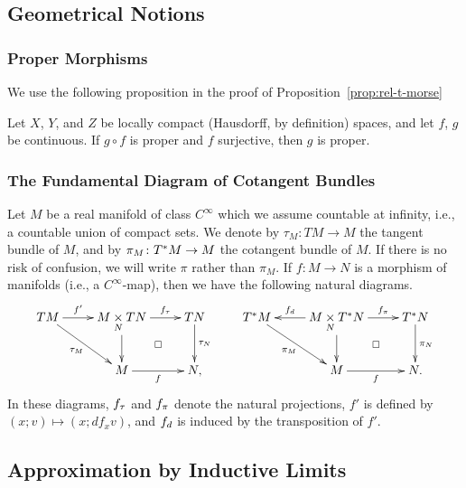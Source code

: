 \subsection{Geometrical Notions}
\subsubsection{Proper Morphisms}
We use the following proposition in the proof of Proposition~\ref{prop:rel-t-morse}
\begin{Proposition+}\label{prop:surj-proper}
  Let \(X\), \(Y\), and \(Z\) be
  locally compact (Hausdorff, by definition) spaces, 
  and let \(f\), \(g\) be continuous. 
  If \(g\circ f\) is proper and \(f\) surjective, then \(g\) is proper.
\end{Proposition+}

\subsubsection{The Fundamental Diagram of Cotangent Bundles}
Let \(M\) be a real manifold of class \(C^\infty\) 
which we assume countable at infinity, i.e., a countable union of compact sets. 
We denote by \(\tau_{M}\colon TM\to M\) 
the tangent bundle of \(M\), 
and by \(\pi_{M}\colon \cotb[M] \to M\) 
the cotangent bundle of \(M\). 
If there is no risk of confusion, 
we will write \(\pi\) rather than \(\pi_{M}\). 
If \(f\colon M\to N\) is a morphism of manifolds 
(i.e., a \(C^{\infty}\)-map), 
then we have the following natural diagrams. 
\[\vcenter{\xymatrix{
  TM
    \ar[r]^-{f'}
    \ar[rd]_-{\tau_M} 
  &
  M\dpb[N]TN
    \ar[r]^-{\mptan[f]}
    \ar[d]
    \ar@{}[dr]|\square
  & 
  TN
    \ar[d]^-{\tau_N}
  &
  \cotb[M]
    \ar[rd]_-{\pi_M}
  &
  M\dpb[N]\cotb[N]
    \ar[l]_-{\mdiff[f]}
    \ar[r]^-{\mpb[f]}
    \ar[d]
    \ar@{}[dr]|\square
  &
  \cotb[N]
    \ar[d]^{\pi_N}
  \\
  &
  M
    \ar[r]_-{f}
  &
  N,
  &
  &
  M
    \ar[r]_-{f}
  &
  N.
}}\]
In these diagrams, 
\(\mptan[f]\) and \(\mpb[f]\) denote 
the natural projections, \(f'\) is defined by 
\((x;v)\mapsto (x;df_{x}v)\), 
and \(\mdiff[f]\) is induced by the transposition of \(f'\). 

\subsection{Approximation by Inductive Limits}


